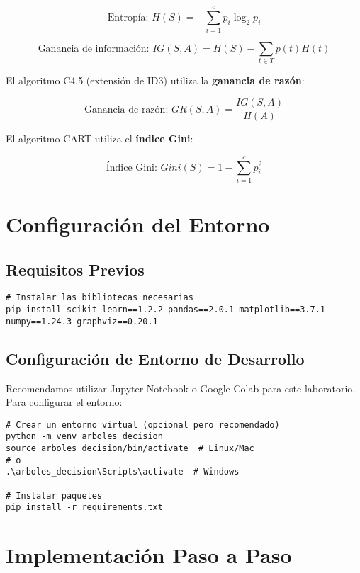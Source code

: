 \documentclass[12pt]{article}
\begin{document}
\begin{equation}
\text{Entropía: } H(S) = -\sum_{i=1}^{c} p_i \log_2 p_i
\end{equation}

\begin{equation}
\text{Ganancia de información: } IG(S, A) = H(S) - \sum_{t \in T} p(t) H(t)
\end{equation}

El algoritmo C4.5 (extensión de ID3) utiliza la \textbf{ganancia de razón}:

\begin{equation}
\text{Ganancia de razón: } GR(S, A) = \frac{IG(S, A)}{H(A)}
\end{equation}

El algoritmo CART utiliza el \textbf{índice Gini}:

\begin{equation}
\text{Índice Gini: } Gini(S) = 1 - \sum_{i=1}^{c} p_i^2
\end{equation}

\section{Configuración del Entorno}

\subsection{Requisitos Previos}
\begin{lstlisting}
# Instalar las bibliotecas necesarias
pip install scikit-learn==1.2.2 pandas==2.0.1 matplotlib==3.7.1 numpy==1.24.3 graphviz==0.20.1
\end{lstlisting}

\subsection{Configuración de Entorno de Desarrollo}
Recomendamos utilizar Jupyter Notebook o Google Colab para este laboratorio. Para configurar el entorno:

\begin{lstlisting}
# Crear un entorno virtual (opcional pero recomendado)
python -m venv arboles_decision
source arboles_decision/bin/activate  # Linux/Mac
# o
.\arboles_decision\Scripts\activate  # Windows

# Instalar paquetes
pip install -r requirements.txt
\end{lstlisting}

\section{Implementación Paso a Paso}
\end{document}
